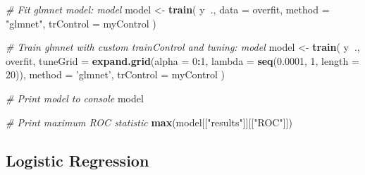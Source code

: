 \documentclass[]{book}
\newenvironment{Shaded}{\begin{snugshade}}{\end{snugshade}}
\newcommand{\KeywordTok}[1]{\textcolor[rgb]{0.13,0.29,0.53}{\textbf{#1}}}
\newcommand{\DataTypeTok}[1]{\textcolor[rgb]{0.13,0.29,0.53}{#1}}
\newcommand{\DecValTok}[1]{\textcolor[rgb]{0.00,0.00,0.81}{#1}}
\newcommand{\FloatTok}[1]{\textcolor[rgb]{0.00,0.00,0.81}{#1}}
\newcommand{\StringTok}[1]{\textcolor[rgb]{0.31,0.60,0.02}{#1}}
\newcommand{\CommentTok}[1]{\textcolor[rgb]{0.56,0.35,0.01}{\textit{#1}}}
\newcommand{\OperatorTok}[1]{\textcolor[rgb]{0.81,0.36,0.00}{\textbf{#1}}}
\newcommand{\NormalTok}[1]{#1}
\begin{document}
\begin{Shaded}
\begin{Highlighting}[]
\CommentTok{# Fit glmnet model: model}
\NormalTok{model <-}\StringTok{ }\KeywordTok{train}\NormalTok{(}
\NormalTok{  y}\OperatorTok{~}\NormalTok{., }\DataTypeTok{data =}\NormalTok{ overfit,}
  \DataTypeTok{method =} \StringTok{"glmnet"}\NormalTok{,}
  \DataTypeTok{trControl =}\NormalTok{ myControl}
\NormalTok{)}

\CommentTok{# Train glmnet with custom trainControl and tuning: model}
\NormalTok{model <-}\StringTok{ }\KeywordTok{train}\NormalTok{(}
\NormalTok{  y}\OperatorTok{~}\NormalTok{., overfit,}
  \DataTypeTok{tuneGrid =} \KeywordTok{expand.grid}\NormalTok{(}\DataTypeTok{alpha =} \DecValTok{0}\OperatorTok{:}\DecValTok{1}\NormalTok{, }\DataTypeTok{lambda =} \KeywordTok{seq}\NormalTok{(}\FloatTok{0.0001}\NormalTok{, }\DecValTok{1}\NormalTok{, }\DataTypeTok{length =} \DecValTok{20}\NormalTok{)),}
  \DataTypeTok{method =} \StringTok{'glmnet'}\NormalTok{,}
  \DataTypeTok{trControl =}\NormalTok{ myControl}
\NormalTok{)}

\CommentTok{# Print model to console}
\NormalTok{model}

\CommentTok{# Print maximum ROC statistic}
\KeywordTok{max}\NormalTok{(model[[}\StringTok{"results"}\NormalTok{]][[}\StringTok{"ROC"}\NormalTok{]])}
\end{Highlighting}
\end{Shaded}

\subsection{Logistic Regression}\label{logistic-regression-1}

\begin{Shaded}
\end{Shaded}
\end{document}
